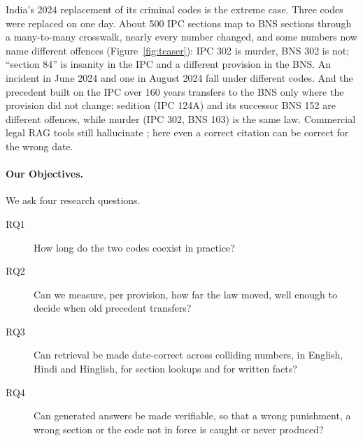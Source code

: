 \documentclass[sigconf,nonacm]{acmart}
\begin{document}
India's 2024 replacement of its criminal codes is the extreme case. Three codes were replaced on
one day. About 500 IPC sections map to BNS sections through a many-to-many crosswalk, nearly every
number changed, and some numbers now name different offences (Figure~\ref{fig:teaser}): IPC 302 is murder, BNS 302 is not;
``section 84'' is insanity in the IPC and a different provision in the BNS. An incident in June
2024 and one in August 2024 fall under different codes. And the precedent built on the IPC over
160 years transfers to the BNS only where the provision did not change: sedition (IPC 124A) and
its successor BNS 152 are different offences, while murder (IPC 302, BNS 103) is the same law.
Commercial legal RAG tools still hallucinate \cite{magesh2025}; here even a correct citation can be
correct for the wrong date.

\paragraph{Our Objectives.} We ask four research questions.
\begin{description}
\item[RQ1] How long do the two codes coexist in practice?
\item[RQ2] Can we measure, per provision, how far the law moved, well enough to decide when old
precedent transfers?
\item[RQ3] Can retrieval be made date-correct across colliding numbers, in English, Hindi and
Hinglish, for section lookups and for written facts?
\item[RQ4] Can generated answers be made verifiable, so that a wrong punishment, a wrong section or
the code not in force is caught or never produced?
\end{description}
\end{document}
